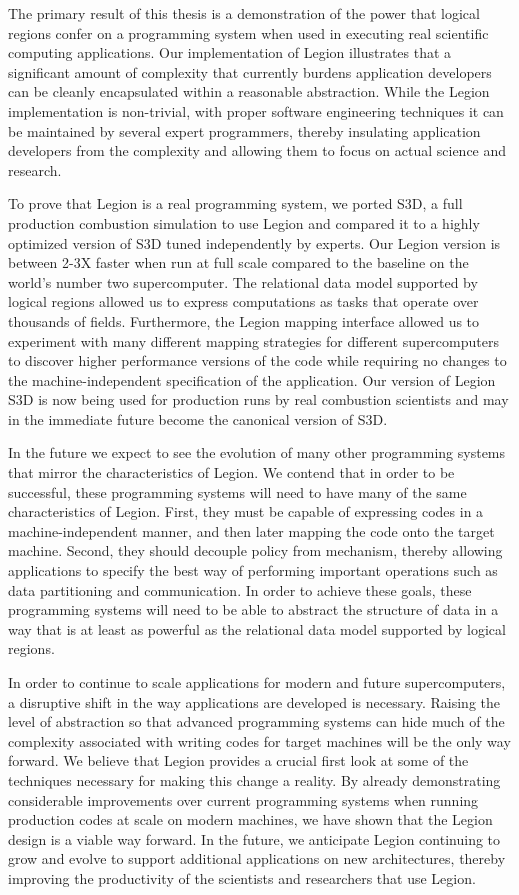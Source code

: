 The primary result of this thesis is a demonstration
of the power that logical regions confer on a programming
system when used in executing real scientific computing
applications. Our implementation of Legion illustrates
that a significant amount of complexity that currently
burdens application developers can be cleanly encapsulated
within a reasonable abstraction. While the Legion 
implementation is non-trivial, with proper software engineering
techniques it can be maintained by several expert programmers,
thereby insulating application developers from the complexity
and allowing them to focus on actual science and research.

To prove that Legion is a real programming system, we ported
S3D, a full production combustion simulation to use Legion
and compared it to a highly optimized version of S3D tuned
independently by experts. Our Legion version is between 2-3X
faster when run at full scale compared to the baseline on the
world's number two supercomputer. The relational data model
supported by logical regions allowed us to express computations
as tasks that operate over thousands of fields. Furthermore,
the Legion mapping interface allowed us to experiment with
many different mapping strategies for different supercomputers
to discover higher performance versions of the code while
requiring no changes to the machine-independent specification
of the application. Our version of Legion S3D is now being
used for production runs by real combustion scientists
and may in the immediate future become the canonical version
of S3D.

In the future we expect to see the evolution of many 
other programming systems that mirror the characteristics
of Legion.  We contend that in order to be successful, these
programming systems will need to have many of the same
characteristics of Legion.  First, they must be capable of
expressing codes in a machine-independent manner, and then 
later mapping the code onto the target machine. Second, they
should decouple policy from mechanism, thereby allowing
applications to specify the best way of performing important
operations such as data partitioning and communication. In
order to achieve these goals, these programming systems 
will need to be able to abstract the structure of data in 
a way that is at least as powerful as the relational data
model supported by logical regions.

In order to continue to scale applications for modern and
future supercomputers, a disruptive shift in the way 
applications are developed is necessary. Raising the level of
abstraction so that advanced programming systems can hide 
much of the complexity associated with writing codes for
target machines will be the only way forward. We believe
that Legion provides a crucial first look at some of the
techniques necessary for making this change a reality.
By already demonstrating considerable improvements over 
current programming systems when running production 
codes at scale on modern machines, we have shown that
the Legion design is a viable way forward. In 
the future, we anticipate Legion continuing to grow
and evolve to support additional applications on 
new architectures, thereby improving the productivity
of the scientists and researchers that use Legion.

